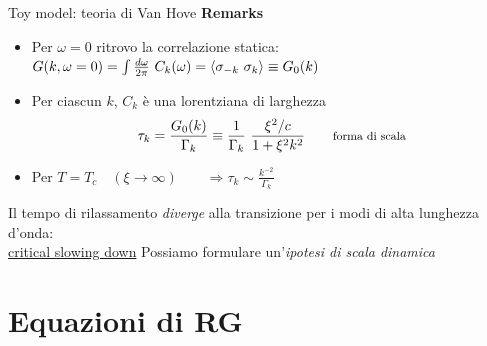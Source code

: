 \documentclass[10pt]{beamer}
\begin{document}
\begin{frame}{Toy model: teoria di Van Hove}
 \textbf{Remarks}
 \begin{itemize}
  \item Per $\omega = 0$ ritrovo la correlazione statica:\\
  $G(k,\omega = 0) = \int \frac{d\omega}{2\pi} \ C_k(\omega) = \mean{\sigma_{-k}\ \sigma_k} \equiv G_0(k)$
  \item Per ciascun $k$, $C_k$ è una lorentziana di larghezza
  \begin{equation*}
   \displaystyle \tau_k = \frac{G_0(k)}{\Gamma_k} \equiv \frac{1}{\Gamma_k}\ \frac{\xi^2/c}{1+\xi^2 k^2}\qquad \text{\footnotesize forma di scala}
  \end{equation*}
  
  \item Per $T = T_c \quad \left( \xi \to \infty\right) \qquad \Longrightarrow \displaystyle \tau_k \sim \frac{k^{-2}}{\Gamma_k}$
 \end{itemize}
 Il tempo di rilassamento \emph{diverge} alla transizione per i modi di alta lunghezza d'onda:\\
    \centering \underline{critical slowing down}
Possiamo formulare un'\emph{ipotesi di scala dinamica}

\end{frame}



\section{Equazioni di RG}
\end{document}
